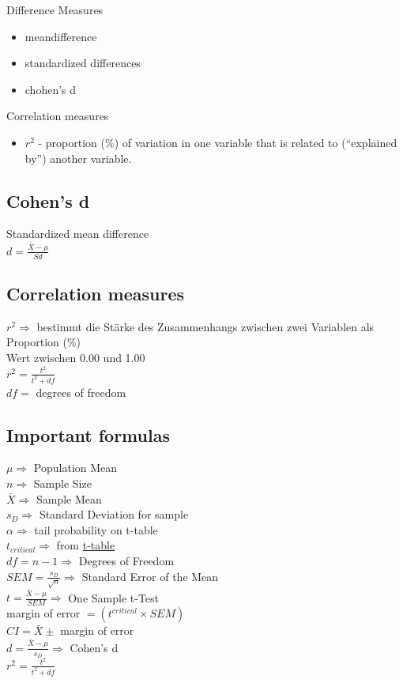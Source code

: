 \documentclass[landscape]{article}
\begin{document}
		Difference Measures
		\begin{itemize}
			\item meandifference
			\item standardized differences
			\item chohen's d
		\end{itemize}	

		Correlation measures
		\begin{itemize}
			\item \(r^2\) - proportion (\%) of variation in one variable that is related to (``explained by'') another variable.
		\end{itemize}

		\subsection{Cohen's d}
			Standardized mean difference 
			\\\(d = \frac{\bar{X} - \mu}{Sd}\)

		\subsection{Correlation measures}
			\(r^2 \Rightarrow\) bestimmt die Stärke des Zusammenhangs zwischen zwei Variablen als Proportion (\%)
			\\Wert zwischen 0.00 und 1.00
			\\\(r^2 = \frac{t^2}{t^2 + df}\)
			\\\(df = \) degrees of freedom


		\subsection{Important formulas}
			\(\mu \Rightarrow\) Population Mean
			\\\(n \Rightarrow\) Sample Size
			\\\(\bar{X} \Rightarrow\) Sample Mean
			\\\(s_D \Rightarrow\) Standard Deviation for sample
			\\\(\alpha \Rightarrow\) tail probability on t-table
			\\\(t_{critical} \Rightarrow\) from \href{https://s3.amazonaws.com/udacity-hosted-downloads/t-table.jpg}{t-table}
			\\\(df = n - 1 \Rightarrow\) Degrees of Freedom
			\\\(SEM = \frac{s_D}{\sqrt{n}} \Rightarrow\) Standard Error of the Mean
			\\\(t = \frac{\bar{X} - \mu}{SEM} \Rightarrow\) One Sample t-Test
			\\margin of error \(= (t^{critical} \times SEM)\)
			\\\(CI = \bar{X} \pm \) margin of error
			\\\(d = \frac{\bar{X}-\mu}{s_D} \Rightarrow\) Cohen's d
			\\\(r^2 = \frac{t^2}{t^2 + df}\)
	
\end{document}
